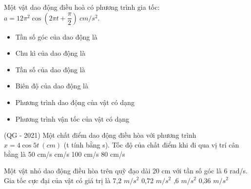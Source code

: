 \begin{vidu}
Một vật dao động điều hoà có phương trình gia tốc: $a=12\pi^2\cos(2\pi t+\dfrac{\pi}{2})\ cm/s^2$.
\begin{itemize} 
\item[1.] Tần số góc của dao động là\dotfill
\item[2.] Chu kì của dao động là\dotfill
\item[3.] Tần số của dao động là\dotfill
\item[4.] Biên độ của dao động là\dotfill
\item[5.] Phương trình dao động của vật có dạng\dotfill
\item[6.] Phương trình vận tốc của vật có dạng\dotfill
\end{itemize}
\end{vidu} %

\begin{vidu}
(QG - 2021) Một chất điểm dao động điều hòa với phương trình $x=4\cos5t\ (cm)$ (t tính bằng s). Tốc độ của chất điểm khi đi qua vị trí cân bằng là
\choice
{50 cm/s}
{ cm/s}
{100 cm/s}
{80 cm/s}
\end{vidu} 
\begin{vidu}%
Một vật nhỏ dao động điều hòa trên quỹ đạo dài 20 cm với tần số góc là 6 rad/s. Gia tốc cực đại của vật có giá trị là
\choice
{7,2 $m/s^2$}
{0,72 $m/s^2$}
{,6 $m/s^2$}
{0,36 $m/s^2$}
\end{vidu}

